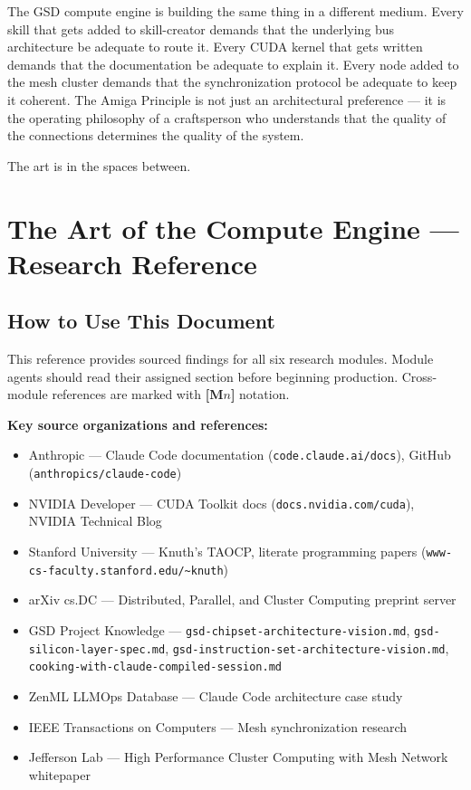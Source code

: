 \documentclass[11pt,letterpaper]{article}
\newcommand{\stageheader}[2]{%
  \noindent\colorbox{#2}{\makebox[\textwidth][l]{%
    \textcolor{white}{\bfseries\sffamily\hspace{6pt}#1\hspace{6pt}}}}%
  \vspace{0.5em}\par%
}
\begin{document}
The GSD compute engine is building the same thing in a different medium. Every skill that gets added to skill-creator demands that the underlying bus architecture be adequate to route it. Every CUDA kernel that gets written demands that the documentation be adequate to explain it. Every node added to the mesh cluster demands that the synchronization protocol be adequate to keep it coherent. The Amiga Principle is not just an architectural preference --- it is the operating philosophy of a craftsperson who understands that the quality of the connections determines the quality of the system.

The art is in the spaces between.

\newpage

\stageheader{STAGE 2 --- RESEARCH REFERENCE}{secondary}

\section{The Art of the Compute Engine --- Research Reference}

\subsection{How to Use This Document}

This reference provides sourced findings for all six research modules. Module agents should read their assigned section before beginning production. Cross-module references are marked with \textbf{[M$n$]} notation.

\textbf{Key source organizations and references:}
\begin{itemize}[leftmargin=1.5em]
  \item Anthropic --- Claude Code documentation (\texttt{code.claude.ai/docs}), GitHub (\texttt{anthropics/claude-code})
  \item NVIDIA Developer --- CUDA Toolkit docs (\texttt{docs.nvidia.com/cuda}), NVIDIA Technical Blog
  \item Stanford University --- Knuth's TAOCP, literate programming papers (\texttt{www-cs-faculty.stanford.edu/\textasciitilde knuth})
  \item arXiv cs.DC --- Distributed, Parallel, and Cluster Computing preprint server
  \item GSD Project Knowledge --- \texttt{gsd-chipset-architecture-vision.md}, \texttt{gsd-silicon-layer-spec.md}, \texttt{gsd-instruction-set-architecture-vision.md}, \texttt{cooking-with-claude-compiled-session.md}
  \item ZenML LLMOps Database --- Claude Code architecture case study
  \item IEEE Transactions on Computers --- Mesh synchronization research
  \item Jefferson Lab --- High Performance Cluster Computing with Mesh Network whitepaper
\end{itemize}
\end{document}
